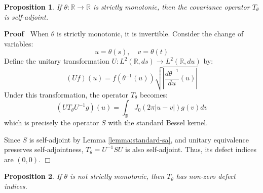 \documentclass{article}
\newenvironment{proof}{\noindent\textbf{Proof\ }}{\hspace*{\fill}$\Box$\medskip}
\newtheorem{proposition}{Proposition}
{\theorembodyfont{\rmfamily}\newtheorem{remark}{Remark}}
\begin{document}
\begin{proposition}
  \label{prop:monotonic-implies-sa}If $\theta : \mathbb{R} \to \mathbb{R}$ is
  strictly monotonic, then the covariance operator $T_{\theta}$ is
  self-adjoint.
\end{proposition}

\begin{proof}
  When $\theta$ is strictly monotonic, it is invertible. Consider the change
  of variables:
  \begin{equation}
    u = \theta (s), \quad v = \theta (t)
  \end{equation}
  Define the unitary transformation $U : L^2 (\mathbb{R}, ds) \to L^2
  (\mathbb{R}, du)$ by:
  \begin{equation}
    (Uf) (u) = f (\theta^{- 1} (u)) \sqrt{\left| \frac{d \theta^{- 1}}{du} (u)
    \right|}
  \end{equation}
  Under this transformation, the operator $T_{\theta}$ becomes:
  \begin{equation}
    (UT_{\theta} U^{- 1} g) (u) = \int_{\mathbb{R}} J_0  (2 \pi |u - v|) g (v)
    dv
  \end{equation}
  which is precisely the operator $S$ with the standard Bessel kernel.
  
  Since $S$ is self-adjoint by Lemma \ref{lemma:standard-sa}, and unitary
  equivalence preserves self-adjointness, $T_{\theta} = U^{- 1} SU$ is also
  self-adjoint. Thus, its defect indices are $(0, 0)$.
\end{proof}

\begin{proposition}
  \label{prop:nonmonotonic-implies-defect}If $\theta$ is not strictly
  monotonic, then $T_{\theta}$ has non-zero defect indices.
\end{proposition}
\end{document}
